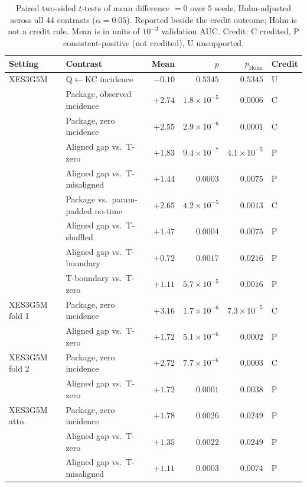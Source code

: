 \begin{table}[H]
\caption{Paired two-sided $t$-tests of mean difference $=0$ over 5
seeds, Holm-adjusted across all 44 contrasts ($\alpha=0.05$).
Reported beside the credit outcome; Holm is not a credit rule. Mean is
in units of $10^{-3}$ validation AUC. Credit: C credited, P consistent-positive (not credited), U unsupported.}
\label{tab:holm-all}
\centering
\scriptsize
\setlength{\tabcolsep}{3pt}
\renewcommand{\arraystretch}{0.84}
\begin{tabular}{@{}llrrrl@{}}
\toprule
Setting & Contrast & Mean & $p$ & $p_{\mathrm{Holm}}$ & Credit \\
\midrule
XES3G5M & Q$\leftarrow$KC incidence & $-0.10$ & $0.5345$ & $0.5345$ & U \\
 & Package, observed incidence & $+2.74$ & $1.8\times10^{-5}$ & $0.0006$ & C \\
 & Package, zero incidence & $+2.55$ & $2.9\times10^{-6}$ & $0.0001$ & C \\
 & Aligned gap vs.\ T-zero & $+1.83$ & $9.4\times10^{-7}$ & $4.1\times10^{-5}$ & P \\
 & Aligned gap vs.\ T-misaligned & $+1.44$ & $0.0003$ & $0.0075$ & P \\
 & Package vs.\ param-padded no-time & $+2.65$ & $4.2\times10^{-5}$ & $0.0013$ & C \\
 & Aligned gap vs.\ T-shuffled & $+1.47$ & $0.0004$ & $0.0075$ & P \\
 & Aligned gap vs.\ T-boundary & $+0.72$ & $0.0017$ & $0.0216$ & P \\
 & T-boundary vs.\ T-zero & $+1.11$ & $5.7\times10^{-5}$ & $0.0016$ & P \\
\addlinespace
XES3G5M fold 1 & Package, zero incidence & $+3.16$ & $1.7\times10^{-6}$ & $7.3\times10^{-5}$ & C \\
 & Aligned gap vs.\ T-zero & $+1.72$ & $5.1\times10^{-6}$ & $0.0002$ & P \\
\addlinespace
XES3G5M fold 2 & Package, zero incidence & $+2.72$ & $7.7\times10^{-6}$ & $0.0003$ & C \\
 & Aligned gap vs.\ T-zero & $+1.72$ & $0.0001$ & $0.0038$ & P \\
\addlinespace
XES3G5M attn. & Package, zero incidence & $+1.78$ & $0.0026$ & $0.0249$ & P \\
 & Aligned gap vs.\ T-zero & $+1.35$ & $0.0022$ & $0.0249$ & P \\
 & Aligned gap vs.\ T-misaligned & $+1.11$ & $0.0003$ & $0.0074$ & P \\

\end{tabular}
\end{table}
